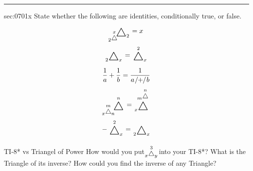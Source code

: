 \renewcommand{\columnseprule}{1.5pt}
\begin{multicols*}{2}
\rule[0.5\baselineskip]{0.4\textwidth}{1pt}
\noindent
\ExSection\label{sec:0701x}
\begin{exercises}{sec:0701x}
\prob[0701Identity] State whether the following are identities, conditionally true, or false.
\subprob $$\tripow{\tripow{2}{x}{}}{}{2} = x$$
\subprob $$\tripow{2}{}{x} = \tripow{}{2}{x}$$
\subprob $$\frac{1}{a} + \frac{1}{b} = \frac{1}{a\mathbin{\!/\mkern-5mu+\mkern-5mu/\!} b}$$
\subprob $$\tripow{\tripow{x}{m}{n}}{n}{} = \tripow{x}{\tripow{m}{n}{}}{}$$
\subprob $$-\tripow{}{2}{x} = \tripow{2}{}{x}$$

\prob[0701Graph] TI-8* vs Triangel of Power
\subprob How would you put $\tripow{x}{3}{y}$ into your TI-8*?
\subprob What is the Triangle of its inverse?
\subprob How could you find the inverse of any Triangle?

\end{exercises}
\end{multicols*}
